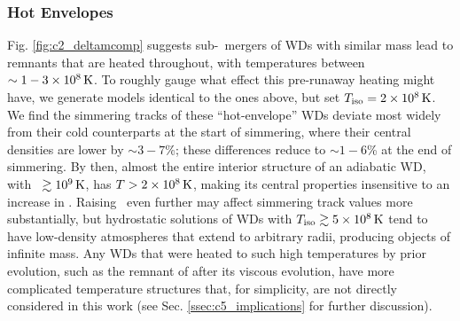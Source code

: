 \subsubsection{Hot Envelopes}
\label{sssec:c5_runaway_ad_hot}




Fig. \ref{fig:c2_deltamcomp} suggests sub-\Mch\ mergers of WDs with similar mass lead to remnants that are heated throughout, with temperatures between $\sim 1 - 3\times10^8\,\mathrm{K}$.  To roughly gauge what effect this pre-runaway heating might have, we generate models identical to the ones above, but set $\tempiso = 2\times10^8\,\mrm{K}$.  We find the simmering tracks of these ``hot-envelope'' WDs deviate most widely from their cold counterparts at the start of simmering, where their central densities are lower by $\sim3-7$\%; these differences reduce to $\sim1 - 6$\% at the end of simmering.  By then, almost the entire interior structure of an adiabatic WD, with \Tc\ $\gtrsim10^9\,\mathrm{K}$, has $T > 2\times10^8\,\mathrm{K}$, making its central properties insensitive to an increase in \tempiso.  Raising \tempiso\ even further may affect simmering track values more substantially, but hydrostatic solutions of WDs with $\tempiso \gtrsim 5\times10^8\,\mrm{K}$ tend to have low-density atmospheres that extend to arbitrary radii, producing objects of infinite mass.  Any WDs that were heated to such high temperatures by prior evolution, such as the remnant of \cite{ji+13} after its viscous evolution, have more complicated temperature structures that, for simplicity, are not directly considered in this work (see Sec. \ref{ssec:c5_implications} for further discussion).

